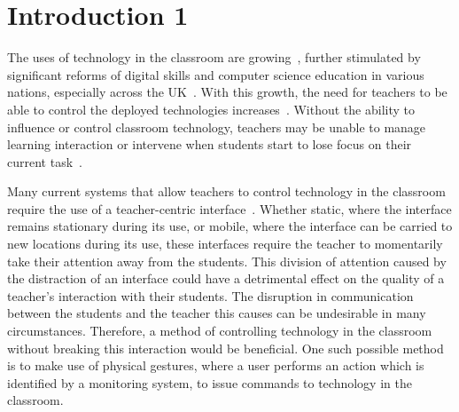 \documentclass[manuscript, review, screen]{acmart}
\begin{document}
%
%


%
%


\maketitle

\section{Introduction 1}
\label{sec:intro1}



The uses of technology in the classroom are
growing~\cite{Schrum2008,Lloyd2011,Robertson2012,mcnaughton-et-al:jce2017},
further stimulated by significant reforms of digital skills and computer science education in various nations, especially across the UK~\cite{brown-et-al:toce2014}.
With this growth, the need for teachers to be able to control the deployed technologies increases~\cite{Apple1990,Selwyn2010,Selwyn2011}.
Without the ability to influence or control classroom technology, teachers may be unable to manage learning interaction or intervene when students start to lose focus on their current task~\cite{Chen2005,Karabenick2011}.

Many current systems that allow teachers to control technology in the classroom require the use of a teacher-centric interface~\cite{Dagdag2011,Kuhn2005,Vila,Zhou2010}.
Whether static, where the interface remains stationary during its use, or mobile, where the interface can be carried to new locations during its use, these interfaces require the teacher to momentarily take their attention away from the students.
This division of attention caused by the distraction of an interface could have a detrimental effect on the quality of a teacher's interaction with their students.
The disruption in communication between the students and the teacher this causes can be undesirable in many circumstances.
Therefore, a method of controlling technology in the classroom without breaking this interaction would be beneficial.
One such possible method is to make use of physical gestures, where a user performs an action which is identified by a monitoring system, to issue commands to technology in the classroom.
\end{document}
